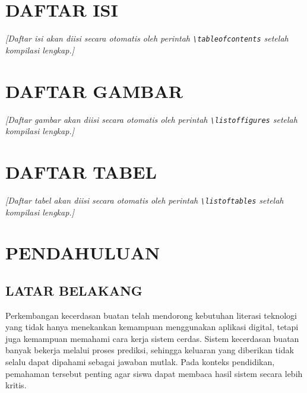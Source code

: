\documentclass[12pt,oneside]{report}
\begin{document}
\chapter*{DAFTAR ISI}

\textit{[Daftar isi akan diisi secara otomatis oleh perintah \texttt{\textbackslash tableofcontents} setelah kompilasi lengkap.]}


\chapter*{DAFTAR GAMBAR}

\textit{[Daftar gambar akan diisi secara otomatis oleh perintah \texttt{\textbackslash listoffigures} setelah kompilasi lengkap.]}


\chapter*{DAFTAR TABEL}

\textit{[Daftar tabel akan diisi secara otomatis oleh perintah \texttt{\textbackslash listoftables} setelah kompilasi lengkap.]}


\chapter{PENDAHULUAN}
\label{chap:bab1}

\section{LATAR BELAKANG}
\label{sec:latar-belakang}

Perkembangan kecerdasan buatan telah mendorong kebutuhan literasi teknologi yang tidak hanya menekankan kemampuan menggunakan aplikasi digital, tetapi juga kemampuan memahami cara kerja sistem cerdas. Sistem kecerdasan buatan banyak bekerja melalui proses prediksi, sehingga keluaran yang diberikan tidak selalu dapat dipahami sebagai jawaban mutlak. Pada konteks pendidikan, pemahaman tersebut penting agar siswa dapat membaca hasil sistem secara lebih kritis.
\end{document}
